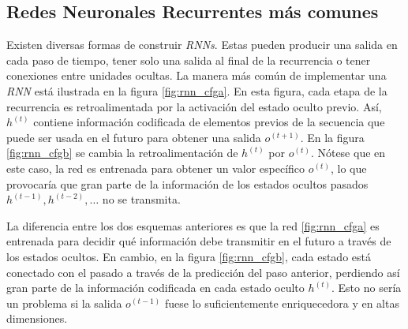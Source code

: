 \subsection{Redes Neuronales Recurrentes más comunes}

Existen diversas formas de construir \textit{RNNs}. Estas pueden producir una
salida en cada paso de tiempo, tener solo una salida al final de la recurrencia o tener
conexiones entre unidades ocultas.
La manera más común de implementar una \textit{RNN} está ilustrada en la
figura \ref{fig:rnn_cfga}. En esta figura, cada etapa de la recurrencia es retroalimentada por la
activación del estado oculto previo. Así, $h^{(t)}$ contiene información codificada de elementos
previos de la secuencia que puede ser usada en el futuro para obtener una salida $o^{(t+1)}$.
En la figura \ref{fig:rnn_cfgb} se
cambia la retroalimentación de $h^{(t)}$ por $o^{(t)}$. Nótese que en este caso, la red es entrenada
para obtener un valor específico $o^{(t)}$, lo que provocaría que gran parte de la información de
los estados ocultos pasados $h^{(t-1)}, h^{(t-2)}, \ldots$ no se transmita.

La diferencia entre los dos esquemas anteriores es que
la red \ref{fig:rnn_cfga} es entrenada para decidir qué información debe transmitir en el futuro a través
de los estados ocultos. En cambio, en la figura \ref{fig:rnn_cfgb}, cada estado está conectado con el
pasado a través de la predicción del paso anterior, perdiendo así gran parte de la información
codificada en cada estado oculto $h^{(t)}$. Esto no sería un problema si la salida $o^{(t-1)}$ fuese
lo suficientemente enriquecedora y en altas dimensiones.


